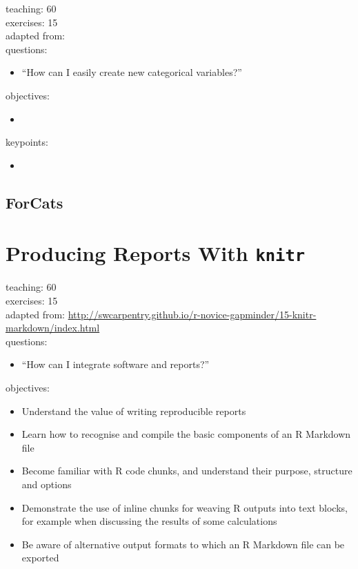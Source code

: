 \documentclass[]{book}
\providecommand{\tightlist}{%
  \setlength{\itemsep}{0pt}\setlength{\parskip}{0pt}}
\begin{document}
teaching: 60\\
exercises: 15\\
adapted from:\\
questions:

\begin{itemize}
\tightlist
\item
  ``How can I easily create new categorical variables?''
\end{itemize}

objectives:

\begin{itemize}
\item
\end{itemize}

keypoints:

\begin{itemize}
\item
\end{itemize}

\section{ForCats}\label{forcats}

\chapter{\texorpdfstring{Producing Reports With
\texttt{knitr}}{Producing Reports With knitr}}\label{knitr}

teaching: 60\\
exercises: 15\\
adapted from:
\url{http://swcarpentry.github.io/r-novice-gapminder/15-knitr-markdown/index.html}\\
questions:

\begin{itemize}
\tightlist
\item
  ``How can I integrate software and reports?''
\end{itemize}

objectives:

\begin{itemize}
\tightlist
\item
  Understand the value of writing reproducible reports\\
\item
  Learn how to recognise and compile the basic components of an R
  Markdown file\\
\item
  Become familiar with R code chunks, and understand their purpose,
  structure and options\\
\item
  Demonstrate the use of inline chunks for weaving R outputs into text
  blocks, for example when discussing the results of some calculations\\
\item
  Be aware of alternative output formats to which an R Markdown file can
  be exported
\end{itemize}
\end{document}
